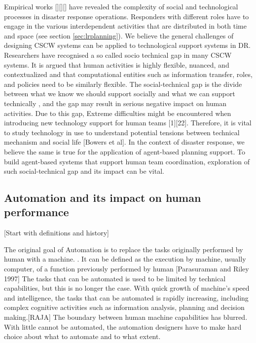 Empirical works [][][] have revealed the complexity of social and technological processes in disaster response operations. Responders with different roles have to engage in the various interdependent activities that are distributed in both time and space (see section \ref{sec:lrplanning}). We believe the general challenges of designing CSCW systems can be applied to technological support systems in DR. Researchers have recognised a so called socio technical gap in many CSCW systems. It is argued that \cite{Ackerman2000}  human activities is highly flexible, nuanced, and contextualized and that computational entities such as information transfer, roles, and policies need to be similarly flexible. The social-technical gap is the divide between what we know we should support socially and what we can support technically \cite{Ackerman2000}, and the gap may result in serious negative impact on human activities. Due to this gap, Extreme difficulties might be encountered when introducing new technology support for human teams [1][22]. Therefore, it is vital to study technology in use to understand potential tensions between technical mechanism and social life [Bowers et al].  In the context of disaster response, we believe the same is true for the application of agent-based planning support. To build agent-based systems that support human team coordination, exploration of such social-technical gap and its impact can be vital. \\ 



\subsection{Automation and its impact on human performance}
[Start with definitions and history]

The original goal of Automation is to replace the tasks originally performed by human with a machine. \cite{Bradshaw2011} . It can be defined as the execution by machine, usually computer, of a function previously performed by human [Parasuraman and Riley 1997] The tasks that can be automated is used to be limited by technical capabilities, but this is no longer the case. With quick growth of machine's speed and intelligence, the tasks that can be automated is rapidly increasing, including complex cognitive activities such as information analysis, planning and decision making.[RAJA] The boundary between human machine capabilities has blurred. With little cannot be automated, the automation designers have to make hard choice about what to automate and to what extent.\\

